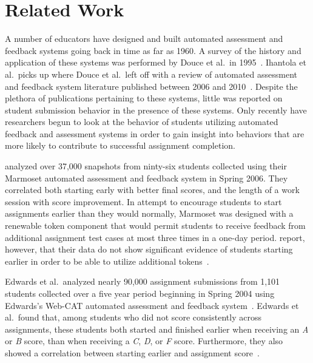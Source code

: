 \section{Related Work}

A number of educators have designed and built automated assessment and feedback
systems going back in time as far as 1960. A survey of the history and
application of these systems was performed by Douce et al.\ in
1995~\cite{Douce:2005:ATA:1163405.1163409}. Ihantola et al.\ picks up where
Douce et al.\ left off with a review of automated assessment and feedback
system literature published between 2006 and
2010~\cite{Ihantola:2010:RRS:1930464.1930480}. Despite the plethora of
publications pertaining to these systems, little was reported on student
submission behavior in the presence of these systems. Only recently have
researchers begun to look at the behavior of students utilizing automated
feedback and assessment systems in order to gain insight into behaviors that
are more likely to contribute to successful assignment completion.

\spacco{} analyzed over 37,000 snapshots from ninty-six students collected
using their Marmoset automated assessment and feedback system in Spring
2006. They correlated both starting early with better final scores, and the
length of a work session with score improvement. In attempt to encourage
students to start assignments earlier than they would normally, Marmoset was
designed with a renewable token component that would permit students to receive
feedback from additional assignment test cases at most three times in a one-day
period. \spacco{} report, however, that their data do not show significant
evidence of students starting earlier in order to be able to utilize additional
tokens~\cite{Spacco:2013:TIP:2462476.2465594, Spacco:2006:EMD:1140124.1140131}.

Edwards et al.\ analyzed nearly 90,000 assignment submissions from 1,101
students collected over a five year period beginning in Spring 2004 using
Edwards's Web-CAT automated assessment and feedback
system~\cite{Edwards:2003:RCS:949344.949390}. Edwards et al.\ found that, among
students who did not score consistently across assignments, these students both
started and finished earlier when receiving an \emph{A} or \emph{B} score, than
when receiving a \emph{C}, \emph{D}, or \emph{F} score. Furthermore, they also
showed a correlation between starting earlier and assignment
score~\cite{Edwards:2009:CEI:1584322.1584325}.

